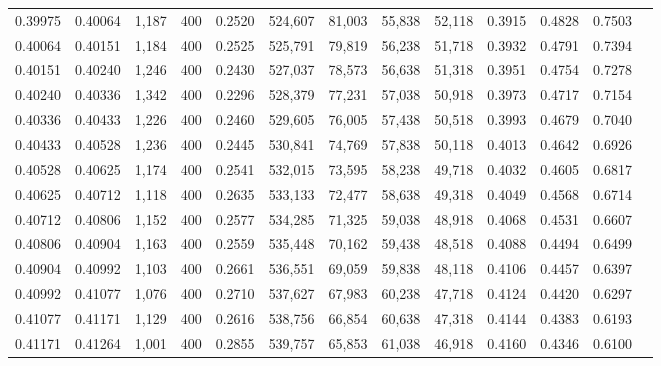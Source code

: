 \begin{tabular}{rrrrrrrrrrrrr}
0.39975 & 0.40064 &  1,187 &   400 &                                     0.2520 & 524,607 &  81,003 &  55,838 &  52,118 & 0.3915 & 0.4828 & 0.7503 \\
0.40064 & 0.40151 &  1,184 &   400 &                                     0.2525 & 525,791 &  79,819 &  56,238 &  51,718 & 0.3932 & 0.4791 & 0.7394 \\
0.40151 & 0.40240 &  1,246 &   400 &                                     0.2430 & 527,037 &  78,573 &  56,638 &  51,318 & 0.3951 & 0.4754 & 0.7278 \\
0.40240 & 0.40336 &  1,342 &   400 &                                     0.2296 & 528,379 &  77,231 &  57,038 &  50,918 & 0.3973 & 0.4717 & 0.7154 \\
0.40336 & 0.40433 &  1,226 &   400 &                                     0.2460 & 529,605 &  76,005 &  57,438 &  50,518 & 0.3993 & 0.4679 & 0.7040 \\
0.40433 & 0.40528 &  1,236 &   400 &                                     0.2445 & 530,841 &  74,769 &  57,838 &  50,118 & 0.4013 & 0.4642 & 0.6926 \\
0.40528 & 0.40625 &  1,174 &   400 &                                     0.2541 & 532,015 &  73,595 &  58,238 &  49,718 & 0.4032 & 0.4605 & 0.6817 \\
0.40625 & 0.40712 &  1,118 &   400 &                                     0.2635 & 533,133 &  72,477 &  58,638 &  49,318 & 0.4049 & 0.4568 & 0.6714 \\
0.40712 & 0.40806 &  1,152 &   400 &                                     0.2577 & 534,285 &  71,325 &  59,038 &  48,918 & 0.4068 & 0.4531 & 0.6607 \\
0.40806 & 0.40904 &  1,163 &   400 &                                     0.2559 & 535,448 &  70,162 &  59,438 &  48,518 & 0.4088 & 0.4494 & 0.6499 \\
0.40904 & 0.40992 &  1,103 &   400 &                                     0.2661 & 536,551 &  69,059 &  59,838 &  48,118 & 0.4106 & 0.4457 & 0.6397 \\
0.40992 & 0.41077 &  1,076 &   400 &                                     0.2710 & 537,627 &  67,983 &  60,238 &  47,718 & 0.4124 & 0.4420 & 0.6297 \\
0.41077 & 0.41171 &  1,129 &   400 &                                     0.2616 & 538,756 &  66,854 &  60,638 &  47,318 & 0.4144 & 0.4383 & 0.6193 \\
0.41171 & 0.41264 &  1,001 &   400 &                                     0.2855 & 539,757 &  65,853 &  61,038 &  46,918 & 0.4160 & 0.4346 & 0.6100 \\

\end{tabular}
